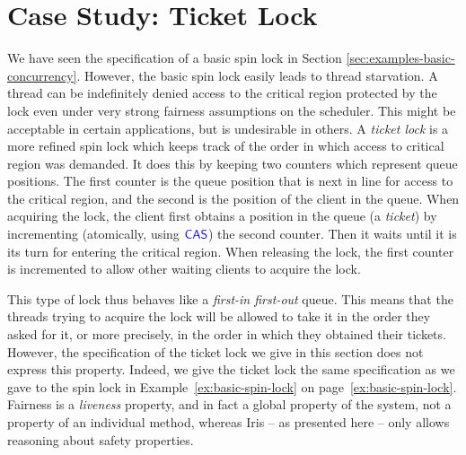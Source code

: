 \section{Case Study: Ticket Lock}
\label{sec:case-study:ticket-lock}

\renewcommand{\isLock}{\operatorname{isLock}}
\renewcommand{\locked}{\operatorname{locked}}
\newcommand{\issued}{\operatorname{issued}}
\renewcommand{\newLock}{\operatorname{newLock}}
\renewcommand{\acquire}{\operatorname{acquire}}
\newcommand{\wait}{\operatorname{wait}}
\renewcommand{\release}{\operatorname{release}}
\newcommand{\lockInv}{\operatorname{lockInv}}

We have seen the specification of a basic spin lock in Section \ref{sec:examples-basic-concurrency}.
However, the basic spin lock easily leads to thread starvation.
A thread can be indefinitely denied access to the critical region protected by the lock even under very strong fairness assumptions on the scheduler.
This might be acceptable in certain applications, but is undesirable in others.
A \emph{ticket lock} is a more refined spin lock which keeps track of the order in which access to critical region was demanded.
It does this by keeping two counters which represent queue positions.
The first counter is the queue position that is next in line for access to the critical region, and the second is the position of the client in the queue.
When acquiring the lock, the client first obtains a position in the queue (a \emph{ticket}) by incrementing (atomically, using $\textsf{\color{blue} CAS}$) the second counter.
Then it waits until it is its turn for entering the critical region.
When releasing the lock, the first counter is incremented to allow other waiting clients to acquire the lock.

This type of lock thus behaves like a \emph{first-in first-out} queue.
This means that the threads trying to acquire the lock will be allowed to take it in the order they asked for it, or more precisely, in the order in which they obtained their tickets.
However, the specification of the ticket lock we give in this section does not express this property.
Indeed, we give the ticket lock the same specification as we gave to the spin lock in Example~\ref{ex:basic-spin-lock} on page~\ref{ex:basic-spin-lock}.
Fairness is a \emph{liveness} property, and in fact a global property of the system, \ie{} not a property of an individual method, whereas Iris -- as presented here -- only allows reasoning about safety properties.

